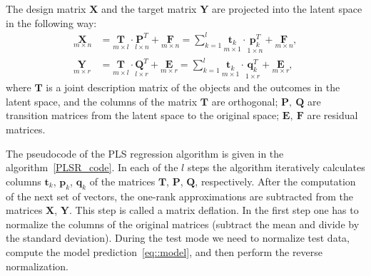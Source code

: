 \documentclass[12pt,twoside]{article}
\begin{document}
The design matrix $\mathbf{X}$ and the target matrix $\mathbf{Y}$ are projected into the latent space in the following way:
\begin{align}
\label{eq::PLS_X}
 \underset{m \times n}{\mathbf{X}} 
 &= \underset{m \times l}{\mathbf{T}} \cdot \underset{l \times n}{\mathbf{P}^{T}} + \underset{m \times n}{\mathbf{F}} 
 = \sum_{k=1}^l \underset{m \times 1}{\mathbf{t}_k} \cdot \underset{1 \times n}{\mathbf{p}_k^{T}} + \underset{m \times n}{\mathbf{F}},\\
 \label{eq::PLS_Y}
 \underset{m \times r}{\mathbf{Y}} 
 &= \underset{m \times l}{\mathbf{T}} \cdot \underset{l \times r}{\mathbf{Q}^{T}} + \underset{m \times r}{\mathbf{E}}
 =  \sum_{k=1}^l  \underset{m \times 1}{\mathbf{t}_k} \cdot \underset{1 \times r}{\mathbf{q}_k^{T}} +  \underset{m \times r}{\mathbf{E}},
\end{align}
where $\mathbf{T}$ is a joint description matrix of the objects and the outcomes in the latent space, and the columns of the matrix $\mathbf{T}$ are orthogonal; $\mathbf{P},\ \mathbf{Q}$ are transition matrices from the latent space to the original space; $\mathbf{E},\ \mathbf{F}$ are residual matrices.

The pseudocode of the PLS regression algorithm is given in the algorithm~\ref{PLSR_code}.
In each of the $l$ steps the algorithm iteratively calculates columns $\mathbf{t}_k$, $\mathbf{p}_k$, $\mathbf{q}_k$ of the matrices $\mathbf{T}$, $\mathbf{P}$, $\mathbf{Q}$, respectively. 
After the computation of the next set of vectors, the one-rank approximations are subtracted from the matrices $\mathbf{X}$, $\mathbf{Y}$. 
This step is called a matrix deflation.
In the first step one has to normalize the columns of the original matrices (subtract the mean and divide by the standard deviation).
During the test mode we need to normalize test data, compute the model prediction~\eqref{eq::model}, and then perform the reverse normalization.
\end{document}
